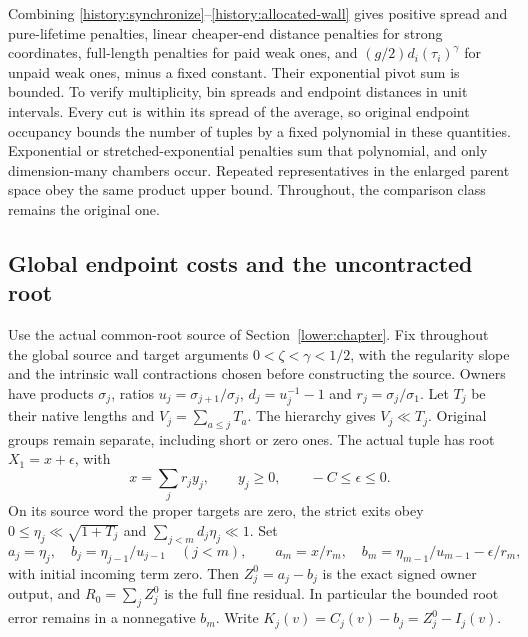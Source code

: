 Combining \eqref{history:synchronize}--\eqref{history:allocated-wall}
gives positive spread and pure-lifetime penalties, linear cheaper-end
distance penalties for strong coordinates, full-length penalties for
paid weak ones, and $(g/2)d_i(\tau_i)^\gamma$ for unpaid weak ones,
minus a fixed constant. Their exponential pivot sum is bounded.
To verify multiplicity, bin spreads and endpoint distances in unit
intervals. Every cut is within its spread of the average, so original
endpoint occupancy bounds the number of tuples by a fixed polynomial
in these quantities. Exponential or stretched-exponential penalties
sum that polynomial, and only dimension-many chambers occur. Repeated
representatives in the enlarged parent space obey the same product
upper bound. Throughout, the comparison class remains the original
one.

\subsection{Global endpoint costs and the uncontracted root}

Use the actual common-root source of Section~\ref{lower:chapter}.
Fix throughout the global source and target arguments
$0<\zeta<\gamma<1/2$, with the regularity slope and the intrinsic
wall contractions chosen before constructing the source.
Owners have products $\sigma_j$, ratios
$u_j=\sigma_{j+1}/\sigma_j$, $d_j=u_j^{-1}-1$ and
$r_j=\sigma_j/\sigma_1$. Let $T_j$ be their native lengths and
$V_j=\sum_{a\le j}T_a$. The hierarchy gives $V_j\ll T_j$.
Original groups remain separate, including short or zero ones.
The actual tuple has root $X_1=x+\epsilon$, with
\[
 x=\sum_jr_jy_j,\qquad y_j\ge0,\qquad-C\le\epsilon\le0.
\]
On its source word the proper targets are zero, the strict exits obey
$0\le\eta_j\ll\sqrt{1+T_j}$ and $\sum_{j<m}d_j\eta_j\ll1$.
Set
\[
 a_j=\eta_j,\quad b_j=\eta_{j-1}/u_{j-1}\quad(j<m),\qquad
 a_m=x/r_m,\quad b_m=\eta_{m-1}/u_{m-1}-\epsilon/r_m,
\]
with initial incoming term zero. Then $Z_j^0=a_j-b_j$ is the exact
signed owner output, and $R_0=\sum_jZ_j^0$ is the full fine residual.
In particular the bounded root error remains in a nonnegative $b_m$.
Write $K_j(v)=C_j(v)-b_j=Z_j^0-I_j(v)$.

